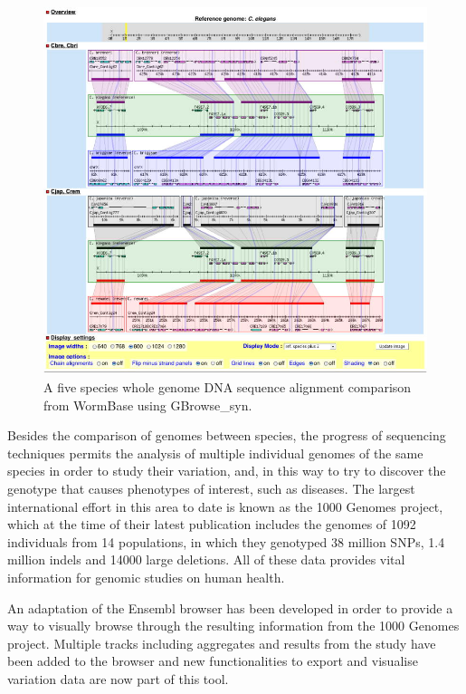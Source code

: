 \begin{figure}  
\centering
\includegraphics[width=\textwidth]{figures/gbrowse_syn.jpg}
\caption[Multiple alignment snapshot generated with GBrowse\_syn.]{A five species whole genome DNA sequence alignment comparison from WormBase using GBrowse\_syn.
\label{fig:gbrowsesyn}}
\end{figure}

Besides the comparison of genomes between species, the progress of sequencing techniques permits the analysis of multiple individual genomes of the same species in order to study their variation, and, in this way to try to discover the genotype that causes phenotypes of interest, such as diseases. The largest international effort in this area to date is known as the 1000 Genomes project, which at the time of their latest publication \cite{GEN2012} includes the genomes of 1092 individuals from 14 populations, in which they genotyped 38 million SNPs, 1.4 million indels and 14000 large deletions. All of these data provides vital information for genomic studies on human health.

An adaptation of the Ensembl browser has been developed in order to provide a way to visually browse through the resulting information from the 1000 Genomes project. Multiple tracks including aggregates and results from the study have been added to the browser and new functionalities to export and visualise variation data are now part of this tool.

